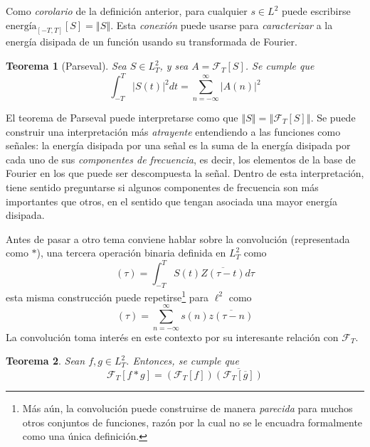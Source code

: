 \documentclass[12pt,letterpaper,draft]{book}
\newtheorem{teorema}{Teorema}[chapter]
\newcommand{\abso}[1]{\left| #1 \right|}
\newcommand{\norma}[1]{\left\Vert #1 \right\Vert}
\begin{document}
Como \textit{corolario} de la definición anterior, para cualquier $s\in L^{2}$ puede escribirse $\text{energía}_{[-T,T]}[S] = \norma{S}$.
%
Esta \textit{conexión} puede usarse para \textit{caracterizar} a la energía disipada de un función usando su transformada de Fourier.

\begin{teorema}[Parseval]
Sea $S \in L^{2}_T$, y sea $A = \mathcal{F}_T[S]$. Se cumple que
\begin{equation*}
\int_{-T}^{T} \abso{S(t)}^{2} dt = \sum_{n=-\infty}^{\infty} \abso{A(n)}^{2}
\end{equation*}
\label{parseval}
\end{teorema}

El teorema de Parseval puede interpretarse como que $\norma{S} = \norma{\mathcal{F}_T[S]}$.
%
Se puede construir una interpretación más \textit{atrayente} entendiendo a las funciones como señales:
la energía disipada por una señal es la suma de la energía disipada por cada uno de sus \textit{componentes de frecuencia}, es decir, los elementos de la base de Fourier en los que puede ser descompuesta la señal.
%
Dentro de esta interpretación, tiene sentido preguntarse si algunos componentes de frecuencia son más importantes que otros, en el sentido que tengan asociada una mayor energía disipada.

Antes de pasar a otro tema conviene hablar sobre la convolución (representada como $\ast$), una tercera operación binaria definida en $L^{2}_T$ como
\begin{equation}
[S \ast Z] (\tau) = \int_{-T}^{T} S(t) \overline{Z(\tau-t)} d\tau
\end{equation}
esta misma construcción puede repetirse\footnote{Más aún, la convolución puede construirse de manera \textit{parecida} para muchos otros conjuntos de funciones, razón por la cual no se le encuadra formalmente como una única definición.} para $\ell^{2}$ como
\begin{equation}
[s \ast z] (\tau) = \sum_{n=-\infty}^{\infty} s(n) \overline{z(\tau-n)}
\end{equation}
La convolución toma interés en este contexto por su interesante relación con $\mathcal{F}_T$.

\begin{teorema}
Sean $f, g \in L^{2}_T$. Entonces, se cumple que
\begin{equation}
\mathcal{F}_T[f \ast g] = \left( \mathcal{F}_T[f] \right) \overline{\left( \mathcal{F}_T[\overline{g}] \right)}
\end{equation}
\end{teorema}
\end{document}

